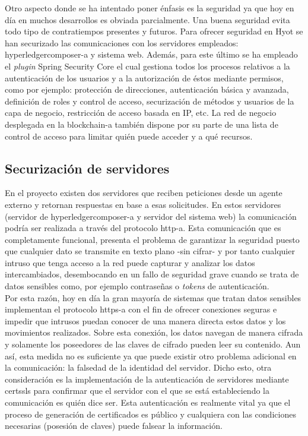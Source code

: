 \documentclass[12pt,a4paper, twoside]{report}
\begin{document}
	Otro aspecto donde se ha intentado poner énfasis es la seguridad ya que hoy en día en muchos desarrollos es obviada parcialmente. Una buena seguridad evita todo tipo de contratiempos presentes y futuros. Para ofrecer seguridad en Hyot se han securizado las comunicaciones con los servidores empleados: \gls{hyperledgercomposer-a} y sistema web. Además, para este último se ha empleado el \textit{plugin} Spring Security Core el cual gestiona todos los procesos relativos a la autenticación de los usuarios y a la autorización de éstos mediante permisos, como por ejemplo: protección de direcciones, autenticación básica y avanzada, definición de roles y control de acceso, securización de métodos y usuarios de la capa de negocio, restricción de acceso basada en IP, etc. La red de negocio desplegada en la \gls{blockchain-a} también dispone por su parte de una lista de control de acceso para limitar quién puede acceder y a qué recursos.
	
	\subsection{Securización de servidores}\label{certificadoSSL}
			
	En el proyecto existen dos servidores que reciben peticiones desde un agente externo y retornan respuestas en base a esas solicitudes. En estos servidores (servidor de \gls{hyperledgercomposer-a} y servidor del sistema web) la comunicación podría ser realizada a través del protocolo \gls{http-a}. Esta comunicación que es completamente funcional, presenta el problema de garantizar la seguridad puesto que cualquier dato se transmite en texto plano -sin cifrar- y por tanto cualquier intruso que tenga acceso a la red puede capturar y analizar los datos intercambiados, desembocando en un fallo de seguridad grave cuando se trata de datos sensibles como, por ejemplo contraseñas o \textit{\glspl{token}} de autenticación. \\

	Por esta razón, hoy en día la gran mayoría de sistemas que tratan datos sensibles implementan el protocolo \gls{https-a} con el fin de ofrecer conexiones seguras e impedir que intrusos puedan conocer de una manera directa estos datos y los movimientos realizados. Sobre esta conexión, los datos navegan de manera cifrada y solamente los poseedores de las claves de cifrado pueden leer su contenido. Aun así, esta medida no es suficiente ya que puede existir otro problema adicional en la comunicación: la falsedad de la identidad del servidor. Dicho esto, otra consideración es la implementación de la autenticación de servidores mediante \glspl{certssl} para confirmar que el servidor con el que se está estableciendo la comunicación es quién dice ser. Esta autenticación es realmente vital ya que el proceso de generación de certificados es público y cualquiera con las condiciones necesarias (posesión de claves) puede falsear la información.  \\
	
\end{document}
